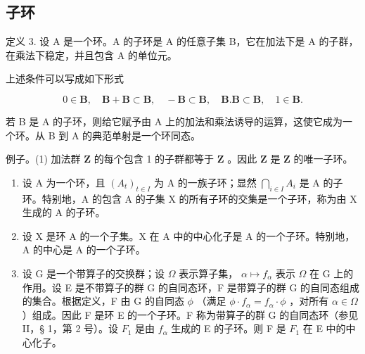 \subsection{子环}

定义 3. 设 A 是一个环。A 的子环是 A 的任意子集 B，它在加法下是 A 的子群，在乘法下稳定，并且包含 A 的单位元。

上述条件可以写成如下形式

\[
0 \in \mathbf {B}, \quad \mathbf {B} + \mathbf {B} \subset \mathbf {B}, \quad - \mathbf {B} \subset \mathbf {B}, \quad \mathbf {B}. \mathbf {B} \subset \mathbf {B}, \quad 1 \in \mathbf {B}.
\]

若 B 是 A 的子环，则给它赋予由 A 上的加法和乘法诱导的运算，这使它成为一个环。从 B 到 A 的典范单射是一个环同态。

例子。(1) 加法群 \(\mathbf{Z}\) 的每个包含 1 的子群都等于 \(\mathbf{Z}\) 。因此 \(\mathbf{Z}\) 是 \(\mathbf{Z}\) 的唯一子环。

\begin{enumerate}
\def\labelenumi{(\arabic{enumi})}
\setcounter{enumi}{1}
\item
  设 A 为一个环，且 \((A_{t})_{t\in I}\) 为 A 的一族子环；显然 \(\bigcap_{i\in I}A_{i}\) 是 A 的子环。特别地，A 的包含 A 的子集 X 的所有子环的交集是一个子环，称为由 X 生成的 A 的子环。
\item
  设 X 是环 A 的一个子集。X 在 A 中的中心化子是 A 的一个子环。特别地，A 的中心是 A 的一个子环。
\item
  设 G 是一个带算子的交换群；设 \(\Omega\) 表示算子集， \(\alpha \mapsto f_{\alpha}\) 表示 \(\Omega\) 在 G 上的作用。设 E 是不带算子的群 G 的自同态环，F 是带算子的群 G 的自同态组成的集合。根据定义，F 由 G 的自同态 \(\phi\) （满足 \(\phi \cdot f_{\alpha} = f_{\alpha} \cdot \phi\) ，对所有 \(\alpha \in \Omega\) ）组成。因此 F 是环 E 的一个子环。F 称为带算子的群 G 的自同态环（参见 II，§ 1，第 2 号）。设 \(F_{1}\) 是由 \(f_{\alpha}\) 生成的 E 的子环。则 F 是 \(F_{1}\) 在 E 中的中心化子。
\end{enumerate}

